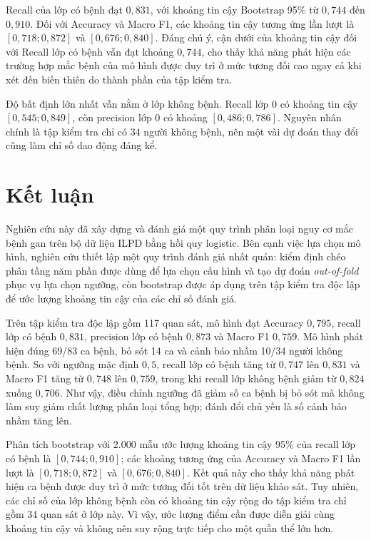 \documentclass[14pt,a4paper]{extarticle}\usepackage[]{graphicx}\usepackage[]{xcolor}
\begin{document}
Recall của lớp có bệnh đạt $0{,}831$, với khoảng tin cậy Bootstrap 95\% từ $0{,}744$ đến $0{,}910$.
Đối với Accuracy và Macro F1, các khoảng tin cậy tương ứng lần lượt là $[0{,}718;0{,}872]$ và $[0{,}676;0{,}840]$.
Đáng chú ý, cận dưới của khoảng tin cậy đối với Recall lớp có bệnh vẫn đạt khoảng $0{,}744$, cho thấy khả năng phát hiện
các trường hợp mắc bệnh của mô hình được duy trì ở mức tương đối cao ngay cả khi xét đến biến thiên do thành phần của tập kiểm tra.


Độ bất định lớn nhất vẫn nằm ở lớp không bệnh. Recall lớp 0 có khoảng tin cậy
$[0{,}545;0{,}849]$, còn precision lớp 0 có khoảng
$[0{,}486;0{,}786]$. Nguyên nhân chính là tập kiểm tra chỉ có 34 người không
bệnh, nên một vài dự đoán thay đổi cũng làm chỉ số dao động đáng kể.

\section{Kết luận}

Nghiên cứu này đã xây dựng và đánh giá một quy trình phân loại nguy cơ mắc
bệnh gan trên bộ dữ liệu ILPD bằng hồi quy logistic. Bên cạnh
việc lựa chọn mô hình, nghiên cứu thiết lập một quy trình đánh giá nhất quán:
kiểm định chéo phân tầng năm phần được dùng để lựa chọn cấu hình và tạo dự
đoán \emph{out-of-fold} phục vụ lựa chọn ngưỡng, còn bootstrap được áp dụng trên
tập kiểm tra độc lập để ước lượng khoảng tin cậy của các chỉ số đánh giá.

Trên tập kiểm tra độc lập gồm 117 quan sát, mô hình đạt Accuracy $0{,}795$,
recall lớp có bệnh $0{,}831$, precision lớp có bệnh $0{,}873$ và Macro F1
$0{,}759$. Mô hình phát hiện đúng 69/83 ca bệnh, bỏ sót 14 ca và cảnh báo
nhầm 10/34 người không bệnh. So với ngưỡng mặc định $0{,}5$, recall lớp có
bệnh tăng từ $0{,}747$ lên $0{,}831$ và Macro F1 tăng từ $0{,}748$ lên
$0{,}759$, trong khi recall lớp không bệnh giảm từ $0{,}824$ xuống $0{,}706$.
Như vậy, điều chỉnh ngưỡng đã giảm số ca bệnh bị bỏ sót mà không làm suy giảm
chất lượng phân loại tổng hợp; đánh đổi chủ yếu là số cảnh báo nhầm tăng lên.

Phân tích bootstrap với 2.000 mẫu ước lượng khoảng tin cậy 95\% của recall
lớp có bệnh là $[0{,}744;0{,}910]$; các khoảng tương ứng của Accuracy và
Macro F1 lần lượt là $[0{,}718;0{,}872]$ và $[0{,}676;0{,}840]$. Kết quả này
cho thấy khả năng phát hiện ca bệnh được duy trì ở mức tương đối tốt trên dữ
liệu khảo sát. Tuy nhiên, các chỉ số của lớp không bệnh còn có khoảng tin cậy
rộng do tập kiểm tra chỉ gồm 34 quan sát ở lớp này. Vì vậy, ước lượng điểm
cần được diễn giải cùng khoảng tin cậy và không nên suy rộng trực tiếp cho
một quần thể lớn hơn.
\end{document}
